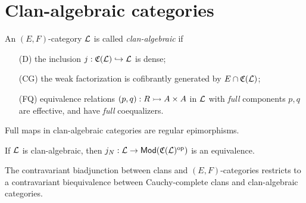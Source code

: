 \documentclass[a4paper]{article}
\begin{document}
\section{Clan-algebraic categories}

\begin{definition}
  An $(E,F)$-category $\mathcal{L}$ is called \emph{clan-algebraic} if
  \begin{enumerate}
  \item[(D)] the inclusion $j : \mathfrak{C}(\mathcal{L}) \hookrightarrow \mathcal{L}$ is dense;
  \item[(CG)] the weak factorization is cofibrantly generated by $E \cap \mathfrak{C}(\mathcal{L})$;
  \item[(FQ)] equivalence relations $(p,q) : R \rightarrowtail A \times A$ in $\mathcal{L}$ with \emph{full} components $p, q$ are effective, and have \emph{full} coequalizers.
  \end{enumerate}
\end{definition}

\begin{lemma}
  Full maps in clan-algebraic categories are regular epimorphisms.
\end{lemma}

\begin{theorem}
  If $\mathcal{L}$ is clan-algebraic, then $j_N : \mathcal{L} \to \mathsf{Mod}(\mathfrak{C}(\mathcal{L})^{\mathrm{op}})$ is an equivalence.
\end{theorem}

\begin{theorem}
  The contravariant biadjunction between clans and $(E,F)$-categories restricts to a contravariant biequivalence between Cauchy-complete clans and clan-algebraic categories.
\end{theorem}

\printbibliography
\end{document}
